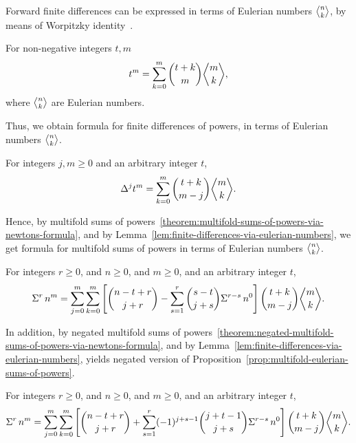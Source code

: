 Forward finite differences can be expressed in terms of
Eulerian numbers $\eulerian{n}{k}$,
by means of Worpitzky identity~\cite{Worpitzky1883}.

\begin{lemma}
  For non-negative integers $t,m$
  \begin{align*}
    t^{m} = \sum_{k=0}^{m} \binom{t+k}{m} \eulerian{m}{k},
  \end{align*}
  where $\eulerian{n}{k}$ are Eulerian numbers.
\end{lemma}
Thus, we obtain formula for finite differences of powers, in terms
of Eulerian numbers $\eulerian{n}{k}$.
\begin{lemma}
  \label{lem:finite-differences-via-eulerian-numbers}
  For integers $j,m \geq 0$ and an arbitrary integer $t$,
  \begin{align*}
    \Delta^{j} t^{m} = \sum_{k=0}^{m} \binom{t+k}{m-j} \eulerian{m}{k}.
  \end{align*}
\end{lemma}

Hence, by multifold sums of
powers~\eqref{theorem:multifold-sums-of-powers-via-newtons-formula},
and by Lemma~\eqref{lem:finite-differences-via-eulerian-numbers},
we get formula for multifold sums of powers in terms of Eulerian
numbers $\eulerian{n}{k}$.

\begin{proposition}
  \label{prop:multifold-eulerian-sums-of-powers}
  For integers $r\geq0$, and $n\geq 0$, and $m\geq 0$,
  and an arbitrary integer $t$,
  \begin{align*}
    \KnuthRFoldSum{r}{n}{m}
    = \sum_{j=0}^{m} \sum_{k=0}^{m}
    \left[ \binom{n-t+r}{j+r} - \sum_{s=1}^{r} \binom{s-t}{j+s}
    \KnuthRFoldSum{r-s}{n}{0} \right]
    \binom{t+k}{m-j} \eulerian{m}{k}.
  \end{align*}
\end{proposition}

In addition, by negated multifold
sums of
powers~\eqref{theorem:negated-multifold-sums-of-powers-via-newtons-formula},
and by Lemma~\eqref{lem:finite-differences-via-eulerian-numbers},
yields negated version of
Proposition~\eqref{prop:multifold-eulerian-sums-of-powers}.
\begin{proposition}
  \label{prop:multifold-sums-of-powers-via-eulerian-numbers}
  For integers $r\geq0$, and $n\geq 0$, and $m\geq 0$,
  and an arbitrary integer $t$,
  \begin{align*}
    \KnuthRFoldSum{r}{n}{m}
    =\sum_{j=0}^{m} \sum_{k=0}^{m}
    \left[ \binom{n-t+r}{j+r} + \sum_{s=1}^{r} (-1)^{j+s-1}
    \binom{j+t-1}{j+s} \KnuthRFoldSum{r-s}{n}{0} \right]
    \binom{t+k}{m-j} \eulerian{m}{k}.
  \end{align*}
\end{proposition}

